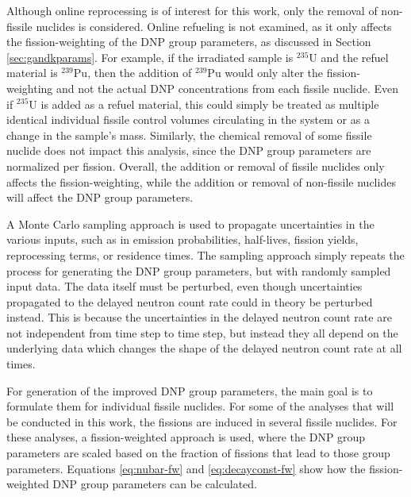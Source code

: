 Although online reprocessing is of interest for this work, only the removal of non-fissile nuclides is considered.
Online refueling is not examined, as it only affects the fission-weighting of the \gls{DNP} group parameters, as discussed in Section \ref{sec:gandkparams}.
For example, if the irradiated sample is $^{235}$U and the refuel material is $^{239}$Pu, then the addition of $^{239}$Pu would only alter the fission-weighting and not the actual \gls{DNP} concentrations from each fissile nuclide.
Even if $^{235}$U is added as a refuel material, this could simply be treated as multiple identical individual fissile control volumes circulating in the system or as a change in the sample's mass.
Similarly, the chemical removal of some fissile nuclide does not impact this analysis, since the \gls{DNP} group parameters are normalized per fission.
Overall, the addition or removal of fissile nuclides only affects the fission-weighting, while the addition or removal of non-fissile nuclides will affect the \gls{DNP} group parameters.


A Monte Carlo sampling approach is used to propagate uncertainties in the various inputs, such as in emission probabilities, half-lives, fission yields, reprocessing terms, or residence times.
The sampling approach simply repeats the process for generating the \gls{DNP} group parameters, but with randomly sampled input data.
The data itself must be perturbed, even though uncertainties propagated to the delayed neutron count rate could in theory be perturbed instead.
This is because the uncertainties in the delayed neutron count rate are not independent from time step to time step, but instead they all depend on the underlying data which changes the shape of the delayed neutron count rate at all times.

For generation of the improved \gls{DNP} group parameters, the main goal is to formulate them for individual fissile nuclides.
For some of the analyses that will be conducted in this work, the fissions are induced in several fissile nuclides.
For these analyses, a fission-weighted approach is used, where the \gls{DNP} group parameters are scaled based on the fraction of fissions that lead to those group parameters.
Equations \eqref{eq:nubar-fw} and \eqref{eq:decayconst-fw} show how the fission-weighted \gls{DNP} group parameters can be calculated.


